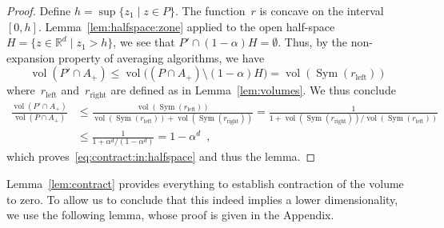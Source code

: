 \documentclass[a4paper,USenglish]{lipics-v2021}
\DeclareMathOperator{\vol}{vol}
\DeclareMathOperator{\Sym}{Sym}
\newcommand{\IR}{\mathbb{R}}
\renewcommand{\leq}{\leqslant}
\begin{document}
\begin{proof}
	Define $h = \sup\{ z_1 \mid z\in P\}$.
	The function~$r$ is concave on the interval~$[0,h]$.
	Lemma~\ref{lem:halfspace:zone} applied to the open half-space
	$H = \{ z\in \IR^d \mid z_1 > h\}$, we see that
	$P' \cap (1-\alpha)H = \emptyset$.
	Thus, by the non-expansion property of averaging algorithms, we have
	\begin{equation*}
		\vol(P'\cap A_+) \leq \vol\big((P\cap A_+) \setminus (1-\alpha)H\big) =  \vol(\Sym(r_\mathrm{left}))
	\end{equation*}
	where~$r_\mathrm{left}$ and~$r_\mathrm{right}$ are defined as in Lemma~\ref{lem:volumes}.
	We thus conclude
	\begin{equation*}
		\begin{split}
			\frac{\vol(P'\cap A_+)}{\vol(P\cap A_+)}
			& \leq
			\frac{\vol(\Sym(r_\mathrm{left}))}{\vol(\Sym(r_\mathrm{left})) + \vol(\Sym(r_\mathrm{right}))}
			=
			\frac{1}{1 + \vol(\Sym(r_\mathrm{right}))/ \vol(\Sym(r_\mathrm{left}))}
			\\
			& \leq
			\frac{1}{1 + \alpha^d/(1-\alpha^d)}
			=
			1 - \alpha^d
			\enspace,
		\end{split}
	\end{equation*}
	which proves~\eqref{eq:contract:in:halfspace}
	and thus the lemma.
\end{proof}

Lemma~\ref{lem:contract} provides everything to establish contraction of the volume to zero.
To allow us to conclude that this indeed implies a lower dimensionality, we use the following lemma, whose proof is given in the Appendix.
\end{document}
